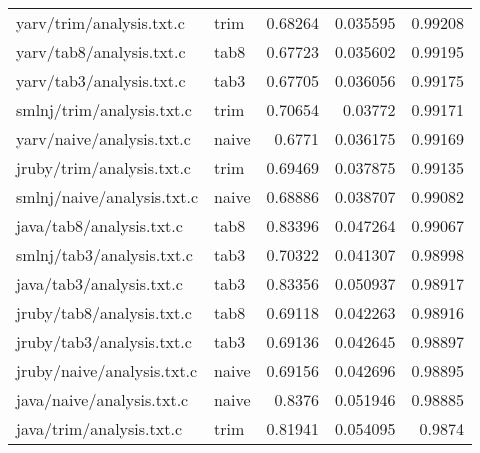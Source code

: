 \begin{longtable}{l l r r r}
{yarv/trim/analysis.txt.c} & trim & 0.68264 & 0.035595 & 0.99208 \\
{yarv/tab8/analysis.txt.c} & tab8 & 0.67723 & 0.035602 & 0.99195 \\
{yarv/tab3/analysis.txt.c} & tab3 & 0.67705 & 0.036056 & 0.99175 \\
{smlnj/trim/analysis.txt.c} & trim & 0.70654 & 0.03772 & 0.99171 \\
{yarv/naive/analysis.txt.c} & naive & 0.6771 & 0.036175 & 0.99169 \\
{jruby/trim/analysis.txt.c} & trim & 0.69469 & 0.037875 & 0.99135 \\
{smlnj/naive/analysis.txt.c} & naive & 0.68886 & 0.038707 & 0.99082 \\
{java/tab8/analysis.txt.c} & tab8 & 0.83396 & 0.047264 & 0.99067 \\
{smlnj/tab3/analysis.txt.c} & tab3 & 0.70322 & 0.041307 & 0.98998 \\
{java/tab3/analysis.txt.c} & tab3 & 0.83356 & 0.050937 & 0.98917 \\
{jruby/tab8/analysis.txt.c} & tab8 & 0.69118 & 0.042263 & 0.98916 \\
{jruby/tab3/analysis.txt.c} & tab3 & 0.69136 & 0.042645 & 0.98897 \\
{jruby/naive/analysis.txt.c} & naive & 0.69156 & 0.042696 & 0.98895 \\
{java/naive/analysis.txt.c} & naive & 0.8376 & 0.051946 & 0.98885 \\
{java/trim/analysis.txt.c} & trim & 0.81941 & 0.054095 & 0.9874 \\
\end{longtable}
